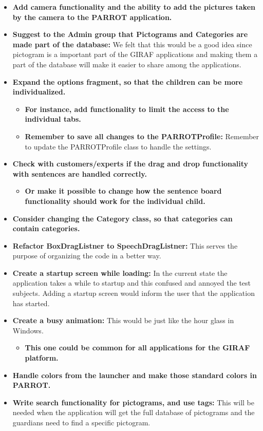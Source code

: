 \begin{itemize}
	\item \textbf{Add camera functionality and the ability to add the pictures taken by the camera to the PARROT application.}
	\item \textbf{Suggest to the Admin group that Pictograms and Categories are made part of the database:} We felt that this would be a good idea since pictogram is a important part of the GIRAF applications and making them a part of the database will make it easier to share among the applications. 
	\item \textbf{Expand the options fragment, so that the children can be more individualized.}
	\begin{itemize}		
		\item \textbf{For instance, add functionality to limit the access to the individual tabs.}
		\item \textbf{Remember to save all changes to the PARROTProfile:} Remember to update the PARROTProfile class to handle the settings.
 	\end{itemize}	
	\item \textbf{Check with customers/experts if the drag and drop functionality with sentences are handled correctly.}
	\begin{itemize}
		\item \textbf{Or make it possible to change how the sentence board functionality should work for the individual child.}
	\end{itemize}	
	\item \textbf{Consider changing the Category class, so that categories can contain categories.}
	
	\item \textbf{Refactor BoxDragListner to SpeechDragListner:} This serves the purpose of organizing the code in a better way.
	\item \textbf{Create a startup screen while loading:} In the current state the application takes a while to startup and this confused	and annoyed the test subjects. Adding a startup screen would inform the user that the application has started.
	
	\item \textbf{Create a busy animation:} This would be just like the hour glass in Windows. 
		\begin{itemize}
		\item \textbf{This one could be common for all applications for the GIRAF platform.}
		\end{itemize}
	\item \textbf{Handle colors from the launcher and make those standard colors in PARROT.}
	\item \textbf{Write search functionality for pictograms, and use tags:} This will be needed when the application will get the full database of pictograms and the guardians need to find a specific pictogram. 


\end{itemize}
